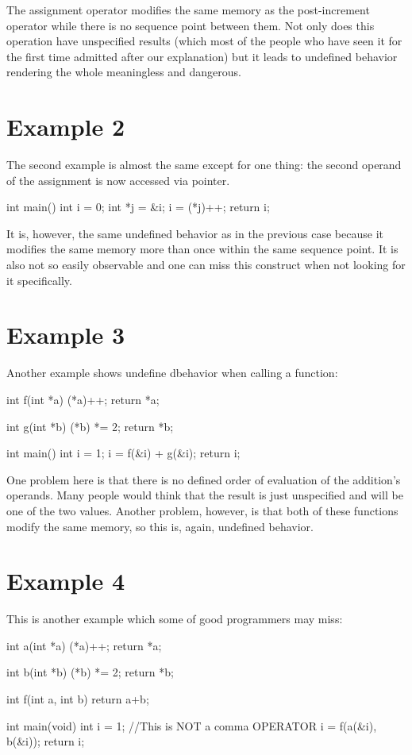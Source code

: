 The assignment operator modifies the same memory as the post-increment operator while there is no sequence point between them. Not only does this operation have unspecified results (which most of the people who have seen it for the first time admitted after our explanation) but it leads to undefined behavior rendering the whole meaningless and dangerous.

\section{Example 2}\label{example2}
The second example is almost the same except for one thing: the second operand of the assignment is now accessed via pointer.
\\\begin{code}
int main(){
	int i = 0;
	int *j = &i;
	i = (*j)++;
    return i;
}
\end{code}\label{example2}

It is, however, the same undefined behavior as in the previous case because it modifies the same memory more than once within the same sequence point. It is also not so easily observable and one can miss this construct when not looking for it specifically.

\section{Example 3}\label{example3}
Another example shows undefine dbehavior when calling a function:
\\\begin{code}
int f(int *a){
    (*a)++;
    return *a;
}

int g(int *b){
    (*b) *= 2;
    return *b;
}

int main(){
    int i = 1;
    i = f(&i) + g(&i);
    return i;
}
\end{code}\label{example3}

One problem here is that there is no defined order of evaluation of the addition's operands. Many people would think that the result is just unspecified and will be one of the two values. Another problem, however, is that both of these functions modify the same memory, so this is, again, undefined behavior.

\section{Example 4}\label{example4}
This is another example which some of good programmers may miss:
\\\begin{code}
int a(int *a){
    (*a)++;
    return *a;
}

int b(int *b){
    (*b) *= 2;
    return *b;
}

int f(int a, int b){
    return a+b;
}

int main(void){
    int i = 1;
    //This is NOT a comma OPERATOR
    i = f(a(&i), b(&i));
    return i;
}
\end{code}

